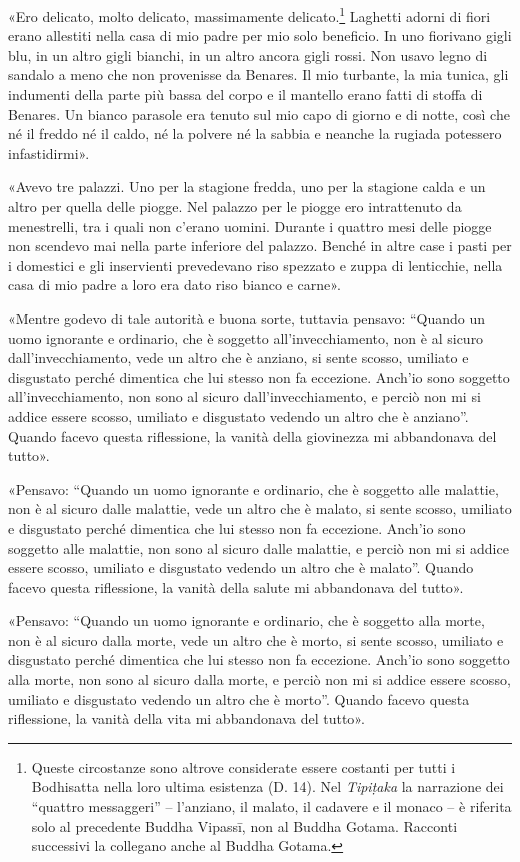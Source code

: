  «Ero delicato, molto delicato, massimamente
delicato.\footnote{Queste circostanze sono altrove considerate essere costanti per tutti i Bodhisatta nella loro ultima esistenza (D. 14). Nel \emph{Tipiṭaka} la narrazione dei “quattro messaggeri” – l’anziano, il malato, il cadavere e il monaco – è riferita solo al precedente Buddha Vipassī, non al Buddha Gotama. Racconti successivi la collegano anche al Buddha Gotama.} Laghetti adorni di fiori erano allestiti
nella casa di mio padre per mio solo beneficio. In uno fiorivano gigli
blu, in un altro gigli bianchi, in un altro ancora gigli rossi. Non
usavo legno di sandalo a meno che non provenisse da Benares. Il mio
turbante, la mia tunica, gli indumenti della parte più bassa del corpo e
il mantello erano fatti di stoffa di Benares. Un bianco parasole era
tenuto sul mio capo di giorno e di notte, così che né il freddo né il
caldo, né la polvere né la sabbia e neanche la rugiada potessero
infastidirmi».


«Avevo tre palazzi. Uno per la stagione fredda, uno per la stagione
calda e un altro per quella delle piogge. Nel palazzo per le piogge ero
intrattenuto da menestrelli, tra i quali non c’erano uomini. Durante i
quattro mesi delle piogge non scendevo mai nella parte inferiore del
palazzo. Benché in altre case i pasti per i domestici e gli inservienti
prevedevano riso spezzato e zuppa di lenticchie, nella casa di mio padre
a loro era dato riso bianco e carne».


«Mentre godevo di tale autorità e buona sorte, tuttavia pensavo: “Quando
un uomo ignorante e ordinario, che è soggetto all’invecchiamento, non è
al sicuro dall’invecchiamento, vede un altro che è anziano, si sente
scosso, umiliato e disgustato perché dimentica che lui stesso non fa
eccezione. Anch’io sono soggetto all’invecchiamento, non sono al sicuro
dall’invecchiamento, e perciò non mi si addice essere scosso, umiliato e
disgustato vedendo un altro che è anziano”. Quando facevo questa
riflessione, la vanità della giovinezza mi abbandonava del tutto».


«Pensavo: “Quando un uomo ignorante e ordinario, che è soggetto alle
malattie, non è al sicuro dalle malattie, vede un altro che è malato, si
sente scosso, umiliato e disgustato perché dimentica che lui stesso non
fa eccezione. Anch’io sono soggetto alle malattie, non sono al sicuro
dalle malattie, e perciò non mi si addice essere scosso, umiliato e
disgustato vedendo un altro che è malato”. Quando facevo questa
riflessione, la vanità della salute mi abbandonava del tutto».


«Pensavo: “Quando un uomo ignorante e ordinario, che è soggetto alla
morte, non è al sicuro dalla morte, vede un altro che è morto, si sente
scosso, umiliato e disgustato perché dimentica che lui stesso non fa
eccezione. Anch’io sono soggetto alla morte, non sono al sicuro dalla
morte, e perciò non mi si addice essere scosso, umiliato e disgustato
vedendo un altro che è morto”. Quando facevo questa riflessione, la
vanità della vita mi abbandonava del tutto».




